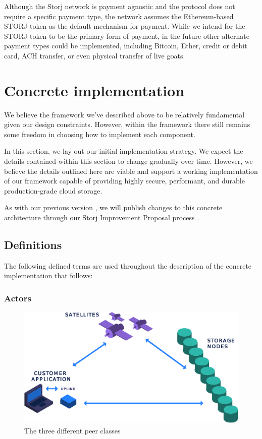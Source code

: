 \documentclass[8pt,fleqn,openany]{book}
\begin{document}
Although the Storj network is payment agnostic and
the protocol does not require a specific payment type,
the network assumes the Ethereum-based STORJ token as the default mechanism
for payment. While we intend for the STORJ token to be the primary form of payment, in the future other alternate payment types could be implemented, including Bitcoin,
Ether, credit or debit card, ACH transfer, or even physical transfer of
live goats.

\chapter{Concrete implementation}\label{chap:concrete}

We believe the framework we've described above to be relatively fundamental
given our design constraints. However, within the framework there still remains
some freedom in choosing how to implement each component.

In this section, we lay out our initial implementation strategy. We expect
the details contained within this section to change gradually over time.
However, we believe the details outlined here are viable and support a working
implementation of our framework capable of providing highly secure, performant,
and durable production-grade cloud storage.

As with our previous version \cite{storj-v2}, we will publish changes to this
concrete architecture through our Storj Improvement Proposal process \cite{sips}.

\section{Definitions}

The following defined terms are used throughout the description of the concrete
implementation that follows:

\subsection{Actors}

\begin{figure}[!htbp]
\centering
\includegraphics[width=.75\textwidth]{images/overview.eps}
\caption{The three different peer classes}
\end{figure}
\end{document}
